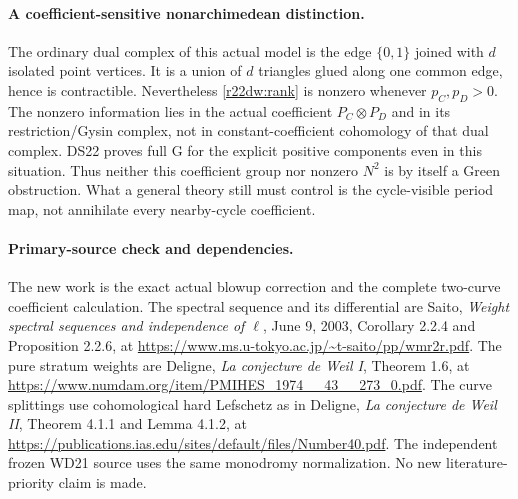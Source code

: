 \paragraph{A coefficient-sensitive nonarchimedean distinction.}
The ordinary dual complex of this actual model is the edge
$\{0,1\}$ joined with $d$ isolated point vertices.  It is a union
of $d$ triangles glued along one common edge, hence is contractible.
Nevertheless \eqref{r22dw:rank} is nonzero whenever $p_C,p_D>0$.
The nonzero information lies in the actual coefficient
$P_C\otimes P_D$ and in its restriction/Gysin complex, not in
constant-coefficient cohomology of that dual complex.  DS22 proves
full G for the explicit positive components even in this situation.
Thus neither this coefficient group nor nonzero $N^2$ is by itself
a Green obstruction.  What a general theory still must control is
the cycle-visible period map, not annihilate every nearby-cycle
coefficient.

\paragraph{Primary-source check and dependencies.}
The new work is the exact actual blowup correction and the complete
two-curve coefficient calculation.  The spectral sequence and
its differential are Saito, \emph{Weight spectral sequences and
independence of $\ell$}, June 9, 2003, Corollary 2.2.4 and
Proposition 2.2.6, at
\url{https://www.ms.u-tokyo.ac.jp/~t-saito/pp/wmr2r.pdf}.
The pure stratum weights are Deligne, \emph{La conjecture de Weil I},
Theorem 1.6, at
\url{https://www.numdam.org/item/PMIHES_1974__43__273_0.pdf}.
The curve splittings use cohomological hard Lefschetz as in
Deligne, \emph{La conjecture de Weil II}, Theorem 4.1.1 and
Lemma 4.1.2, at
\url{https://publications.ias.edu/sites/default/files/Number40.pdf}.
The independent frozen WD21 source uses the same monodromy
normalization.  No new literature-priority claim is made.

